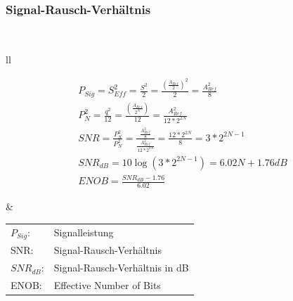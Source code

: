\subsubsection{Signal-Rausch-Verhältnis}\\
\begin{tabular}{ll}

\begin{minipage}{10cm}
\begin{gather}
P_{Sig}=S^2_{Eff} =
\frac{S^2}{2}=\frac{(\frac{A_{Ref}}{2})^2}{2}=\frac{A^2_{Ref}}{8}\\
P^2_{N}=\frac{q^2}{12}=\frac{(\frac{A_{Ref}}{2^N})}{12}=\frac{A^2_{Ref}}{12*2^{2N}}\\
SNR=\frac{P^2_{S}}{P^2_{N}}=\frac{\frac{A^2_{Ref}}{8}}{\frac{A^2_{Ref}}{12*2^{2N}}}=\frac{12*2^{2N}}{8}=3*2^{2N-1}\\
SNR_{dB}=10\log(3*2^{2N-1})=6.02N+1.76dB\\
ENOB=\frac{SNR_{dB}-1.76}{6.02}
\end{gather}
\end{minipage}
&
\begin{minipage}{8cm}
\begin{tabular}{ll}
$P_{Sig}$:&Signalleistung\\
SNR:&Signal-Rausch-Verhältnis\\
$SNR_{dB}$:&Signal-Rausch-Verhältnis in dB\\
ENOB:&Effective Number of Bits\\
\end{tabular}
\end{minipage}
\end{tabular}